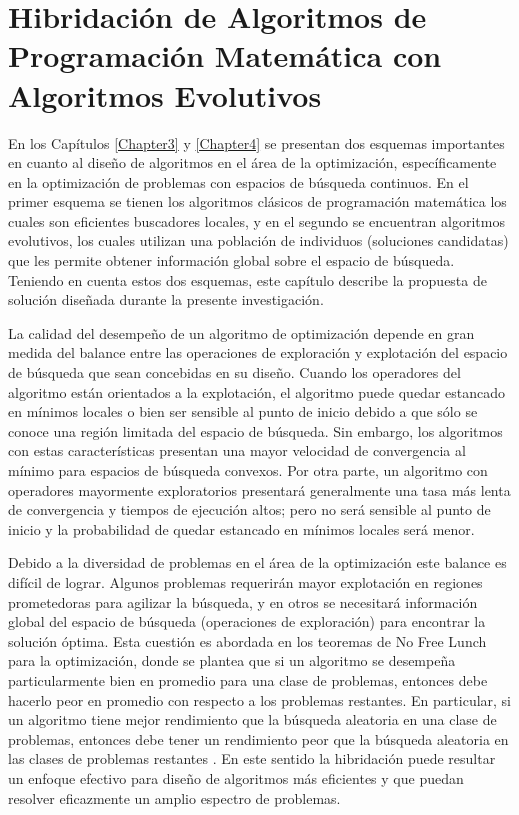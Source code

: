 \chapter{Hibridación de Algoritmos de Programación Matemática con Algoritmos Evolutivos} \label{Chapter6} 


En los Capítulos \ref{Chapter3} y \ref{Chapter4} se presentan dos esquemas importantes en cuanto al diseño de algoritmos en el área de la optimización, específicamente en la optimización de problemas con espacios de búsqueda continuos. En el primer esquema se tienen los algoritmos clásicos de programación matemática los cuales son eficientes buscadores locales, y  en el segundo se encuentran algoritmos evolutivos, los cuales utilizan una población de individuos (soluciones candidatas) que les permite obtener información global sobre el espacio de búsqueda. Teniendo en cuenta estos dos esquemas, este capítulo describe la propuesta de solución diseñada durante la presente investigación.

La calidad del desempeño de un algoritmo de optimización depende en gran medida del balance entre las operaciones de exploración y explotación del espacio de búsqueda que sean concebidas en su diseño. Cuando los operadores del algoritmo están orientados a la explotación, el algoritmo puede quedar estancado en mínimos locales o bien ser sensible al punto de inicio debido a que sólo se conoce una región limitada del espacio de búsqueda. Sin embargo, los algoritmos con estas características presentan una mayor velocidad de convergencia al mínimo para espacios de búsqueda convexos. Por otra parte, un algoritmo con operadores mayormente exploratorios presentará generalmente una tasa más lenta de convergencia y tiempos de ejecución altos; pero no será sensible al punto de inicio y la probabilidad de quedar estancado en mínimos locales será menor.

Debido a la diversidad de problemas en el área de la optimización este balance es difícil de lograr. Algunos problemas requerirán mayor explotación en regiones prometedoras para agilizar la búsqueda, y en otros se necesitará información global del espacio de búsqueda (operaciones de exploración) para encontrar la solución óptima. Esta cuestión es abordada en los teoremas de No Free Lunch para la optimización, donde se plantea que si un algoritmo se desempeña particularmente bien en promedio para una clase de problemas, entonces debe hacerlo peor en promedio con respecto a los problemas restantes. En particular, si un algoritmo tiene mejor rendimiento que la búsqueda aleatoria en una clase de problemas, entonces debe tener un rendimiento peor que la búsqueda aleatoria en las clases de problemas restantes \cite{wolpert1997no}. En este sentido la hibridación puede resultar un enfoque efectivo para diseño de algoritmos más eficientes y que puedan resolver eficazmente un amplio espectro de problemas.

